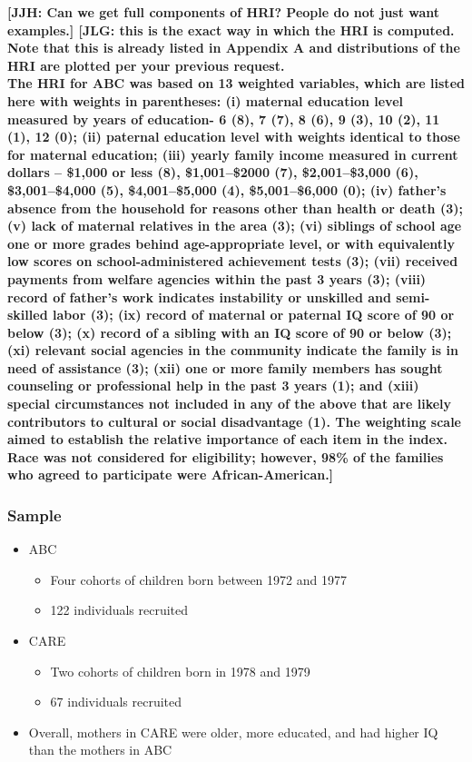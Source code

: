 \documentclass[static]{JJH-Beamer}
\begin{document}
\textbf{[JJH: Can we get full components of HRI? People do not just want examples.] [JLG: this is the exact way in which the HRI is computed. Note that this is already listed in Appendix A and distributions of the HRI are plotted per your previous request.\\
The HRI for ABC was based on 13 weighted variables, which are listed here with weights in parentheses: (i) maternal education level measured by years of education- 6 (8), 7 (7), 8 (6), 9 (3), 10 (2), 11 (1), 12 (0); (ii) paternal education level with weights identical to those for maternal education; (iii) yearly family income measured in current dollars -- \$1,000 or less (8), \$1,001--\$2000 (7), \$2,001--\$3,000 (6), \$3,001--\$4,000 (5), \$4,001--\$5,000 (4), \$5,001--\$6,000 (0); (iv) father's absence from the household for reasons other than health or death (3); (v) lack of maternal relatives in the area (3); (vi) siblings of school age one or more grades behind age-appropriate level, or with equivalently low scores on school-administered achievement tests (3); (vii) received payments from welfare agencies within the past 3 years (3); (viii) record of father's work indicates instability or unskilled and semi-skilled labor (3); (ix) record of maternal or paternal IQ score of 90 or below (3); (x) record of a sibling with an IQ score of 90 or below (3); (xi) relevant social agencies in the community indicate the family is in need of assistance (3); (xii) one or more family members has sought counseling or professional help in the past 3 years (1); and (xiii) special circumstances not included in any of the above that are likely contributors to cultural or social disadvantage (1). The weighting scale aimed to establish the relative importance of each item in the index. Race was not considered for eligibility; however, 98\% of the families who agreed to participate were African-American.]}

\clearpage
\begin{frame}
 \addtocounter{framenumber}{-1}
\frametitle{Sample}\label{sample}

\begin{itemize}
\item ABC
	\begin{itemize}
	\item Four cohorts of children born between 1972 and 1977
	\item 122 individuals recruited
	\end{itemize}
\item CARE
	\begin{itemize}
	\item Two cohorts of children born in 1978 and 1979
	\item 67 individuals recruited
	\end{itemize}
\item Overall, mothers in CARE were older, more educated, and had higher IQ than the mothers in ABC
\end{itemize}

\end{frame}
\end{document}
